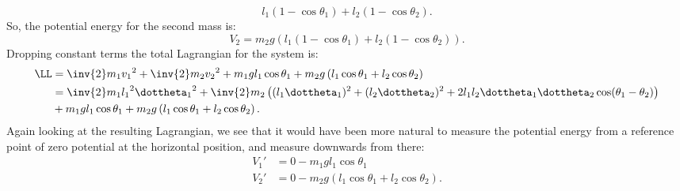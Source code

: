 {\begin{equation}
l_1 (1 - \cos\theta_1) + l_2 (1 - \cos\theta_2).
\end{equation}
%
So, the potential energy for the second mass is:
\begin{equation}\label{eqn:tongMf1:1260}
V_2 = m_2 g \left( l_1 (1 - \cos\theta_1) + l_2 (1 - \cos\theta_2) \right).
\end{equation}
%
Dropping constant terms the total Lagrangian for the system is:
%
\begin{equation}\label{eqn:tongMf1:280}
\begin{aligned}
\LL
&= \inv{2}m_1 {v_1}^2 +\inv{2}m_2 {v_2}^2 + m_1 g l_1 \cos\theta_1 + m_2 g \left( l_1 \cos\theta_1 + l_2 \cos\theta_2 \right) \\
&=
\inv{2} m_1 {l_1}^2 {\dottheta_1}^2
+ \inv{2} m_2 \left( (l_1 \dottheta_1)^2 + (l_2 \dottheta_2)^2 + 2 l_1 l_2 \dottheta_1 \dottheta_2 \cos(\theta_1 -\theta_2) \right) \\
&+ m_1 g l_1 \cos\theta_1 + m_2 g \left( l_1 \cos\theta_1 + l_2 \cos\theta_2 \right) .
\end{aligned}
\end{equation}
%
Again looking at the resulting Lagrangian, we see that it would have been more natural to measure the potential energy from a reference point of zero potential at the horizontal position, and measure downwards from there:
%
\begin{equation}\label{eqn:tongMf1:300}
\begin{aligned}
V_1' &= 0 - m_1 g l_1 \cos\theta_1 \\
V_2' &= 0 - m_2 g \left( l_1 \cos\theta_1 + l_2 \cos\theta_2 \right).
\end{aligned}
\end{equation}
%
}
